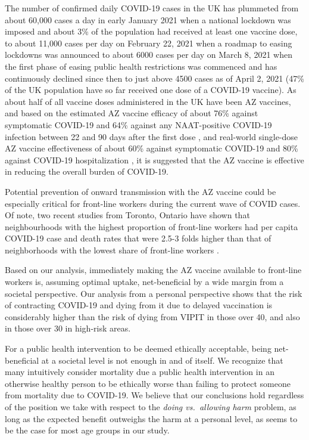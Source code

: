 \documentclass[]{interact}
\theoremstyle{plain}%
\theoremstyle{definition}
\theoremstyle{remark}
\begin{document}
The number of confirmed daily COVID-19 cases in the UK has plummeted
from about 60,000 cases a day in early January 2021 when a national
lockdown was imposed and about 3\% of the population had received at
least one vaccine dose, to about 11,000 cases per day on February 22,
2021 when a roadmap to easing lockdowns was announced to about 6000
cases per day on March 8, 2021 when the first phase of easing public
health restrictions was commenced \citep{bbc_lockdown_2021} and has
continuously declined since then to just above 4500 cases as of April 2,
2021 (47\% of the UK population have so far received one dose of a
COVID-19 vaccine). As about half of all vaccine doses administered in
the UK have been AZ vaccines, and based on the estimated AZ vaccine
efficacy of about 76\% against symptomatic COVID-19 and 64\% against any
NAAT-positive COVID-19 infection between 22 and 90 days after the first
dose \citep{voysey_single-dose_2021}, and real-world single-dose AZ
vaccine effectiveness of about 60\% against symptomatic COVID-19 and
80\% against COVID-19 hospitalization
\citep{public_health_england_1public_2021}, it is suggested that the AZ
vaccine is effective in reducing the overall burden of COVID-19.

Potential prevention of onward transmission with the AZ vaccine could be
especially critical for front-line workers during the current wave of
COVID cases. Of note, two recent studies from Toronto, Ontario have
shown that neighbourhoods with the highest proportion of front-line
workers had per capita COVID-19 case and death rates that were 2.5-3
folds higher than that of neighborhoods with the lowest share of
front-line workers
\citep[\citet{rao_disproportionate_2021}]{chagla_characterizing_2021}.

Based on our analysis, immediately making the AZ vaccine available to
front-line workers is, assuming optimal uptake, net-beneficial by a wide
margin from a societal perspective. Our analysis from a personal
perspective shows that the risk of contracting COVID-19 and dying from
it due to delayed vaccination is considerably higher than the risk of
dying from VIPIT in those over 40, and also in those over 30 in
high-risk areas.

For a public health intervention to be deemed ethically acceptable,
being net-beneficial at a societal level is not enough in and of itself.
We recognize that many intuitively consider mortality due a public
health intervention in an otherwise healthy person to be ethically worse
than failing to protect someone from mortality due to COVID-19. We
believe that our conclusions hold regardless of the position we take
with respect to the \emph{doing vs.~allowing harm}
problem\citep{woollard_doing_2016}, as long as the expected benefit
outweighs the harm at a personal level, as seems to be the case for most
age groups in our study.
\end{document}
